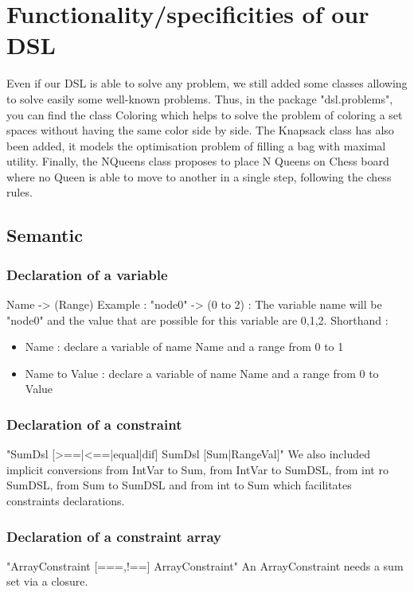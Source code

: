 




\linespread{0.30}
\section{Functionality/specificities of our DSL}
Even if our DSL is able to solve any problem, we still added some classes allowing to solve easily some well-known problems. Thus, in the package "dsl.problems", you can find the class Coloring which helps to solve the problem of coloring a set spaces without having the same color side by side. The Knapsack class has also been added, it models the optimisation problem of filling a bag with maximal utility. Finally, the NQueens class proposes to place N Queens on Chess board where no Queen is able to move to another in a single step, following the chess rules.
\subsection{Semantic}
\subsubsection{Declaration of a variable}
Name -> (Range)\newline
Example : "node0" -> (0 to 2) : The variable name will be "node0" and the value that are possible for this variable are {0,1,2}.\newline
Shorthand :
\begin{itemize}
\item Name : declare a variable of name Name and a range from 0 to 1
\item Name to Value : declare a variable of name Name and a range from 0 to Value
\end{itemize}
\subsubsection{Declaration of a constraint}
"SumDsl [>==|<==|equal|dif] SumDsl [Sum|RangeVal]"\newline
We also included implicit conversions from IntVar to Sum, from IntVar to SumDSL, from int ro SumDSL, from Sum to SumDSL and from int to Sum which facilitates constraints declarations.
\subsubsection{Declaration of a constraint array}
"ArrayConstraint [===,!==] ArrayConstraint"\newline
An ArrayConstraint needs a sum set via a closure.
